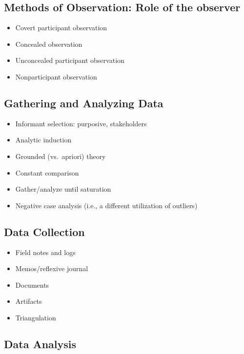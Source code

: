 \documentclass[
  english,
]{book}
\providecommand{\tightlist}{%
  \setlength{\itemsep}{0pt}\setlength{\parskip}{0pt}}
\begin{document}
\hypertarget{methods-of-observation-role-of-the-observer}{%
\subsection{Methods of Observation: Role of the observer}\label{methods-of-observation-role-of-the-observer}}

\begin{itemize}
\tightlist
\item
  Covert participant observation
\item
  Concealed observation
\item
  Unconcealed participant observation
\item
  Nonparticipant observation
\end{itemize}

\hypertarget{gathering-and-analyzing-data}{%
\subsection{Gathering and Analyzing Data}\label{gathering-and-analyzing-data}}

\begin{itemize}
\tightlist
\item
  Informant selection: purposive, stakeholders
\item
  Analytic induction
\item
  Grounded (vs.~apriori) theory
\item
  Constant comparison
\item
  Gather/analyze until saturation
\item
  Negative case analysis (i.e., a different utilization of outliers)
\end{itemize}

\hypertarget{data-collection}{%
\subsection{Data Collection}\label{data-collection}}

\begin{itemize}
\tightlist
\item
  Field notes and logs
\item
  Memos/reflexive journal
\item
  Documents
\item
  Artifacts
\item
  Triangulation
\end{itemize}

\hypertarget{data-analysis}{%
\subsection{Data Analysis}\label{data-analysis}}
\end{document}
